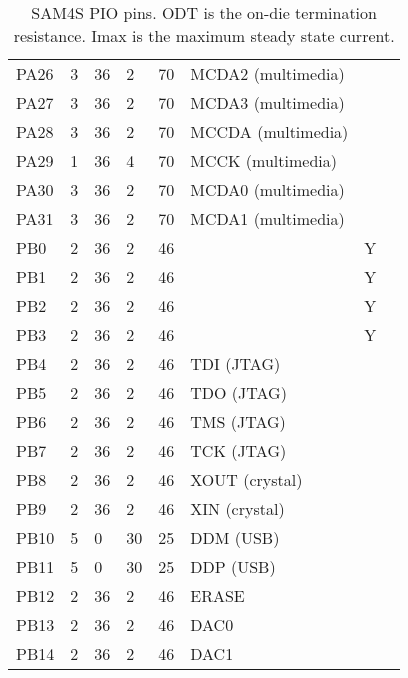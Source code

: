 \begin{table}
\begin{tabular}{llllllll}
    PA26    &  3 & 36 &  2 & 70 & MCDA2 (multimedia)      &    \\
    PA27    &  3 & 36 &  2 & 70 & MCDA3 (multimedia)      &    \\
    PA28    &  3 & 36 &  2 & 70 & MCCDA (multimedia)      &    \\
    PA29    &  1 & 36 &  4 & 70 & MCCK (multimedia)       &    \\
    PA30    &  3 & 36 &  2 & 70 & MCDA0 (multimedia)      &    \\
    PA31    &  3 & 36 &  2 & 70 & MCDA1 (multimedia)      &    \\
    PB0     &  2 & 36 &  2 & 46 &       &  Y  \\
    PB1     &  2 & 36 &  2 & 46 &       &  Y  \\
    PB2     &  2 & 36 &  2 & 46 &       &  Y  \\
    PB3     &  2 & 36 &  2 & 46 &       &  Y  \\
    PB4     &  2 & 36 &  2 & 46 & TDI (JTAG)      &    \\
    PB5     &  2 & 36 &  2 & 46 & TDO (JTAG)     &    \\
    PB6     &  2 & 36 &  2 & 46 & TMS (JTAG)     &    \\
    PB7     &  2 & 36 &  2 & 46 & TCK (JTAG)     &    \\
    PB8     &  2 & 36 &  2 & 46 & XOUT (crystal)    &    \\
    PB9     &  2 & 36 &  2 & 46 & XIN  (crystal)    &    \\
    PB10    &  5 & 0  & 30 & 25 & DDM (USB)       &    \\
    PB11    &  5 & 0  & 30 & 25 & DDP (USB)      &    \\
    PB12    &  2 & 36 &  2 & 46 & ERASE      &    \\
    PB13    &  2 & 36 &  2 & 46 & DAC0      &    \\
    PB14    &  2 & 36 &  2 & 46 & DAC1      &    \\
  \end{tabular}
  \caption{SAM4S PIO pins.  ODT is the on-die termination resistance.
    Imax is the maximum steady state current.}
  \label{tab:pio-pins}
\end{table}
